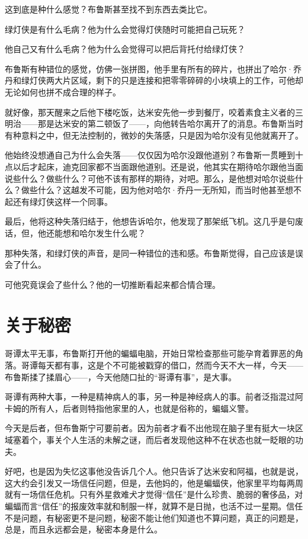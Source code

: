 \documentclass[../main.tex]{subfiles}
\begin{document}
这到底是种什么感觉？布鲁斯甚至找不到东西去类比它。

绿灯侠是有什么毛病？他为什么会觉得灯侠随时可能把自己玩死？

他自己又有什么毛病？他为什么会觉得可以把后背托付给绿灯侠？

布鲁斯有种错位的感觉，仿佛一张拼图，他手里有所有的碎片，也拼出了哈尔·乔丹和绿灯侠两大片区域，剩下的只是连接和把零零碎碎的小块填上的工作，可他却无论如何也拼不成合理的样子。

就好像，那天醒来之后他下楼吃饭，达米安先他一步到餐厅，咬着素食主义者的三明治——那是达米安的第二顿饭了——，向他转告哈尔离开了的消息。布鲁斯当时有种意料之中，但无法控制的，微妙的失落感，只是因为哈尔没有见他就离开了。

他始终没想通自己为什么会失落——仅仅因为哈尔没跟他道别？布鲁斯一贯睡到十点以后才起床，迪克回家都不当面跟他道别。还是说，他其实在期待哈尔跟他当面说些什么？做些什么？可他不该有那样的期待，对吧。那么，是他想对哈尔说些什么？做些什么？这越发不可能，因为他对哈尔·乔丹一无所知，而当时他甚至想不起还有绿灯侠这样一个同事。

最后，他将这种失落归结于，他想告诉哈尔，他发现了那架纸飞机。这几乎是句废话，但，他还能想和哈尔发生什么呢？

那种失落，和绿灯侠的声音，是同一种错位的违和感。布鲁斯觉得，自己应该是误会了什么。

可他究竟误会了些什么？他的一切推断看起来都合情合理。

\section{关于秘密}

哥谭太平无事，布鲁斯打开他的蝙蝠电脑，开始日常检查那些可能孕育着罪恶的角落。哥谭每天都有事，这是个不可能被戳穿的借口，然而今天不大一样，今天——布鲁斯揉了揉眉心——，今天他随口扯的“哥谭有事”，是大事。

哥谭有两种大事，一种是精神病人的事，另一种是神经病人的事。前者泛指混过阿卡姆的所有人，后者则特指他家里的人，也就是俗称的，蝙蝠义警。

今天是后者，但布鲁斯宁可要前者。因为前者才看不出他现在脑子里有挺大一块区域塞着个，事关个人生活的未解之谜，而后者发现他这种不在状态也就一眨眼的功夫。

好吧，也是因为失忆这事他没告诉几个人。他只告诉了达米安和阿福，也就是说，这大约会引发又一场信任问题，但是，去他妈的，他是蝙蝠侠，他家里平均每两周就有一场信任危机。只有外星救难犬才觉得“信任”是什么珍贵、脆弱的奢侈品，对蝙蝠而言“信任”的报废效率就和制服一样，就算不是日抛，也活不过一星期。信任不是问题，有秘密更不是问题，秘密不能让他们知道也不算问题，真正的问题是，总是，而且永远都会是，秘密本身是什么。
\end{document}
